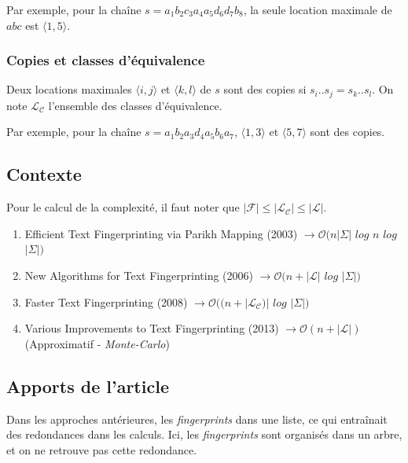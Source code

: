 \documentclass[a4paper]{article}
\begin{document}
Par exemple, pour la chaîne $s = a_{1} b_{2} c_{3} a_{4} a_{5} d_{6} d_{7} b_{8}$, la seule location maximale de $abc$ est $\langle1,5\rangle$.

\subsubsection{Copies et classes d'équivalence}

Deux locations maximales $\langle i,j \rangle$ et $\langle k,l \rangle$ de $s$ sont des copies si $s_{i}..s_{j} = s_{k}..s_{l}$. On note $\mathcal{L}_{\mathcal{C}}$ l'ensemble des classes d'équivalence. \newline

Par exemple, pour la chaîne $s = a_{1} b_{2} a_{3} d_{4} a_{5} b_{6} a_{7}$, $\langle1,3\rangle$ et $\langle5,7\rangle$ sont des copies.

\subsection{Contexte}

Pour le calcul de la complexité, il faut noter que $|\mathcal{F}| \leq |\mathcal{L}_{\mathcal{C}}| \leq |\mathcal{L}|$.

\begin{enumerate}
	\item Efficient Text Fingerprinting via Parikh Mapping (2003) \newline
$\rightarrow \mathcal{O}(n|\Sigma|$ $log$ $n$ $log$ $|\Sigma|)$
	\item New Algorithms for Text Fingerprinting (2006) \newline
$\rightarrow \mathcal{O}(n + |\mathcal{L}|$ $log$ $|\Sigma|)$
	\item Faster Text Fingerprinting (2008) \newline
$\rightarrow \mathcal{O}((n + |\mathcal{L}_{\mathcal{C}})|$ $log$ $|\Sigma|)$
	\item Various Improvements to Text Fingerprinting (2013) \newline
$\rightarrow \mathcal{O}(n + |\mathcal{L}|)$ (Approximatif - \emph{Monte-Carlo})
\end{enumerate}

\subsection{Apports de l'article}

Dans les approches antérieures, les \emph{fingerprints} dans une liste, ce qui entraînait des redondances dans les calculs. Ici, les \emph{fingerprints} sont organisés dans un arbre, et on ne retrouve pas cette redondance.
\end{document}
